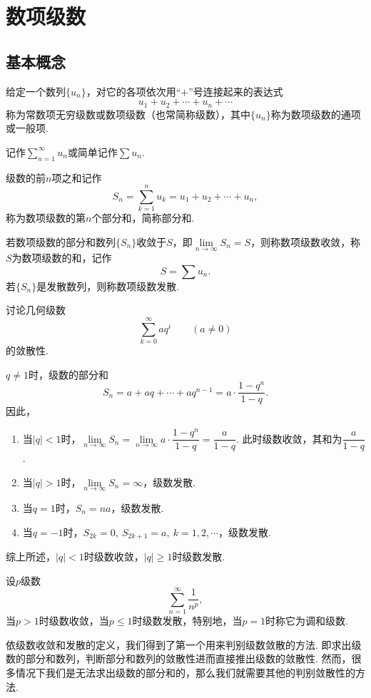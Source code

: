 \chapter{数项级数}
\section{基本概念}
\begin{definition}[数项级数]
	给定一个数列$\{u_n\}$，对它的各项依次用“$+$”号连接起来的表达式
	$$u_1+u_2+\cdots+u_n+\cdots$$
	称为{\heiti 常数项无穷级数}或{\heiti 数项级数}（也常简称{\heiti 级数}），其中$\{u_n\}$称为数项级数的{\heiti 通项}或{\heiti 一般项}.
	
	记作$\displaystyle\sum_{n=1}^{\infty}u_n$或简单记作$\sum u_n$.
	
	级数的前$n$项之和记作
	$$S_n=\sum_{k=1}^{n}u_k=u_1+u_2+\cdots+u_n,$$
	称为数项级数的{\heiti 第$n$个部分和}，简称{\heiti 部分和}.
\end{definition}
\begin{definition}[收敛与发散]
	若数项级数的部分和数列$\{S_n\}$收敛于$S$，即$\lim\limits_{n\to\infty}S_n=S$，则称数项级数{\heiti 收敛}，称$S$为数项级数的{\heiti 和}，记作
	$$S=\sum u_n.$$
	若$\{S_n\}$是发散数列，则称数项级数{\heiti 发散}.
\end{definition}
\begin{example}
	讨论{\heiti 几何级数}
	$$\sum_{k=0}^{\infty}aq^{i}\qquad(a\neq 0)$$
	的敛散性.
\end{example}
\begin{solution}
	$q\neq 1$时，级数的部分和
	$$S_n=a+aq+\cdots+aq^{n-1}=a\cdot\frac{1-q^n}{1-q}.$$
	因此，
	\begin{enumerate}[(1)]
		\item 当$|q|<1$时，$\lim\limits_{n\to\infty}S_n=\lim\limits_{n\to\infty}a\cdot\dfrac{1-q^n}{1-q}=\dfrac{a}{1-q}$. 此时级数收敛，其和为$\dfrac{a}{1-q}$.
		\item 当$|q|>1$时，$\lim\limits_{n\to\infty}S_n=\infty$，级数发散.
		\item 当$q=1$时，$S_{n}=na$，级数发散.
		\item 当$q=-1$时，$S_{2k}=0,\ S_{2k+1}=a,\ k=1,2,\cdots$，级数发散.
	\end{enumerate}
	综上所述，$|q|<1$时级数收敛，$|q|\geqslant 1$时级数发散.
\end{solution}
\begin{example}
	设$p$级数
	$$\sum_{n=1}^{\infty}\frac{1}{n^p},$$
	当$p>1$时级数收敛，当$p\leqslant 1$时级数发散，特别地，当$p=1$时称它为{\heiti 调和级数}.
\end{example}
依级数收敛和发散的定义，我们得到了第一个用来判别级数敛散的方法. 即求出级数的部分和数列，判断部分和数列的敛散性进而直接推出级数的敛散性. 然而，很多情况下我们是无法求出级数的部分和的，那么我们就需要其他的判别敛散性的方法.

